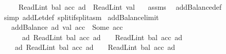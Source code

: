 \begin{isabellebody}
\ \ \ \ \ {\isachardoublequoteopen}ReadL\isactrlsub i\isactrlsub n\isactrlsub t\ {\isacharparenleft}{\kern0pt}bal\ {\isacharparenleft}{\kern0pt}acc\ ad{\isacharparenright}{\kern0pt}{\isacharparenright}{\kern0pt}\ {\isacharplus}{\kern0pt}\ ReadL\isactrlsub i\isactrlsub n\isactrlsub t\ val\ {\isacharless}{\kern0pt}\ {}{\isacharcircum}{\kern0pt}{}{}{}{\isachardoublequoteclose}\isanewline
%
\isadelimproof
%
\endisadelimproof
%
\isatagproof
{}\isamarkupfalse%
\ assms\ \isamarkupfalse%
\ addBalance{\isacharunderscore}{\kern0pt}def\ \isamarkupfalse%
\ {\isacharparenleft}{\kern0pt}simp\ add{\isacharcolon}{\kern0pt}Let{\isacharunderscore}{\kern0pt}def\ split{\isacharcolon}{\kern0pt}if{\isacharunderscore}{\kern0pt}split{\isacharunderscore}{\kern0pt}asm{\isacharparenright}{\kern0pt}%
\endisatagproof
{\isafoldproof}%
%
\isadelimproof
\isanewline
%
\endisadelimproof
\isanewline
{}\isamarkupfalse%
\ addBalance{\isacharunderscore}{\kern0pt}limit{\isacharcolon}{\kern0pt}\isanewline
\ \ \ {\isachardoublequoteopen}addBalance\ ad\ val\ acc\ {\isacharequal}{\kern0pt}\ Some\ acc{\isacharprime}{\kern0pt}{\isachardoublequoteclose}\isanewline
\ \ \ \ \ \ {\isachardoublequoteopen}{\isasymforall}ad{\isachardot}{\kern0pt}\ ReadL\isactrlsub i\isactrlsub n\isactrlsub t\ {\isacharparenleft}{\kern0pt}bal\ {\isacharparenleft}{\kern0pt}acc\ ad{\isacharparenright}{\kern0pt}{\isacharparenright}{\kern0pt}\ {\isasymge}\ {}\ {\isasymand}\ ReadL\isactrlsub i\isactrlsub n\isactrlsub t\ {\isacharparenleft}{\kern0pt}bal\ {\isacharparenleft}{\kern0pt}acc\ ad{\isacharparenright}{\kern0pt}{\isacharparenright}{\kern0pt}\ {\isacharless}{\kern0pt}\ {}\ {\isacharcircum}{\kern0pt}\ {}{}{}{\isachardoublequoteclose}\isanewline
\ \ \ \ {\isachardoublequoteopen}{\isasymforall}ad{\isachardot}{\kern0pt}\ ReadL\isactrlsub i\isactrlsub n\isactrlsub t\ {\isacharparenleft}{\kern0pt}bal\ {\isacharparenleft}{\kern0pt}acc{\isacharprime}{\kern0pt}\ ad{\isacharparenright}{\kern0pt}{\isacharparenright}{\kern0pt}\ {\isasymge}\ {}\ {\isasymand}\ ReadL\isactrlsub i\isactrlsub n\isactrlsub t\ {\isacharparenleft}{\kern0pt}bal\ {\isacharparenleft}{\kern0pt}acc{\isacharprime}{\kern0pt}\ ad{\isacharparenright}{\kern0pt}{\isacharparenright}{\kern0pt}\ {\isacharless}{\kern0pt}\ {}\ {\isacharcircum}{\kern0pt}\ {}{}{}{\isachardoublequoteclose}\isanewline

\end{isabellebody}
